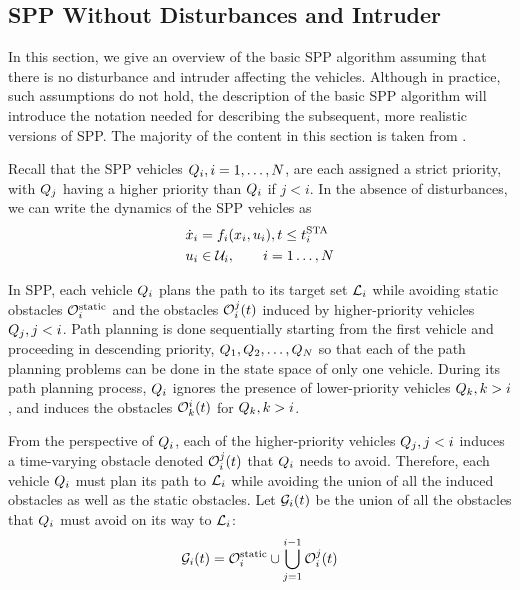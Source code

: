 \subsection{SPP Without Disturbances and Intruder\label{sec:basic}}
In this section, we give an overview of the basic SPP algorithm assuming that there is no disturbance and intruder affecting the vehicles. Although in practice, such assumptions do not hold, the description of the basic SPP algorithm will introduce the notation needed for describing the subsequent, more realistic versions of SPP. The majority of the content in this section is taken from \cite{Chen15c}.

Recall that the SPP vehicles $Q_i, i=1,\ldots,N$, are each assigned a strict priority, with $Q_j$ having a higher priority than $Q_i$ if $j<i$. In the absence of disturbances, we can write the dynamics of the SPP vehicles as
\begin{equation}
\label{eq:dyn_no_dstb}
\begin{aligned}
\dot\state_i &= \fdyn_i(\state_i, \ctrl_i), t \le \sta_i \\
\ctrl_i &\in \cset_i, \qquad i = 1 \ldots, \N
\end{aligned}
\end{equation}

In SPP, each vehicle $Q_i$ plans the path to its target set $\mathcal{L}_i$ while avoiding static obstacles $\mathcal{O}^\text{static}_i$ and the obstacles $\mathcal{O}_i^j(t)$ induced by higher-priority vehicles $Q_j, j<i$. Path planning is done sequentially starting from the first vehicle and proceeding in descending priority, $Q_1, Q_2, \ldots, Q_{N}$ so that each of the path planning problems can be done in the state space of only one vehicle. During its path planning process, $Q_i$ ignores the presence of lower-priority vehicles $Q_k, k>i$, and induces the obstacles $\mathcal{O}_k^i(t)$ for $Q_k, k>i$.

From the perspective of $Q_i$, each of the higher-priority vehicles $Q_j, j<i$ induces a time-varying obstacle denoted $\mathcal{O}_i^j(t)$ that $Q_i$ needs to avoid. Therefore, each vehicle $Q_i$ must plan its path to $\mathcal{L}_i$ while avoiding the union of all the induced obstacles as well as the static obstacles. Let $\mathcal{G}_i(t)$ be the union of all the obstacles that $Q_i$ must avoid on its way to $\mathcal{L}_i$:
\begin{equation}
\label{eq:obsseti}
\obsset_i(t)  = \soset_i \cup \bigcup_{j=1}^{i-1} \ioset_i^j(t)
\end{equation}

